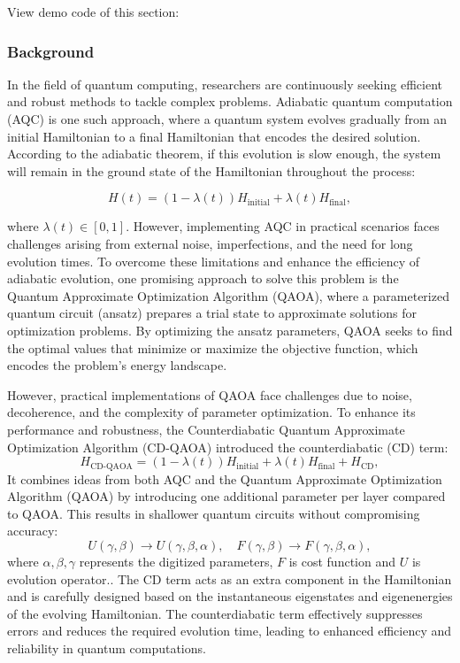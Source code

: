 

View demo code of this section: 

\subsubsection{Background}
In the field of quantum computing, researchers are continuously seeking efficient and robust methods to tackle complex problems. Adiabatic quantum computation (AQC) is one such approach, where a quantum system evolves gradually from an initial Hamiltonian to a final Hamiltonian that encodes the desired solution. According to the adiabatic theorem, if this evolution is slow enough, the system will remain in the ground state of the Hamiltonian throughout the process:

\begin{equation}
    H(t) = (1-\lambda(t))H_{\text{initial}} + \lambda(t)H_{\text{final}},
\end{equation}

where $\lambda(t)\in[0,1]$. However, implementing AQC in practical scenarios faces challenges arising from external noise, imperfections, and the need for long evolution times. To overcome these limitations and enhance the efficiency of adiabatic evolution, one promising approach to solve this problem is the Quantum Approximate Optimization Algorithm (QAOA), where a parameterized quantum circuit (ansatz) prepares a trial state to approximate solutions for optimization problems. By optimizing the ansatz parameters, QAOA seeks to find the optimal values that minimize or maximize the objective function, which encodes the problem's energy landscape.

However, practical implementations of QAOA face challenges due to noise, decoherence, and the complexity of parameter optimization. To enhance its performance and robustness, the Counterdiabatic Quantum Approximate Optimization Algorithm (CD-QAOA) introduced the counterdiabatic (CD) term:
\begin{equation}
    H_{\text{CD-QAOA}} = (1 - \lambda(t))H_{\text{initial}} + \lambda(t)H_{\text{final}} + H_{\text{CD}},
\end{equation}
It combines ideas from both AQC and the Quantum Approximate Optimization Algorithm (QAOA) by introducing one additional parameter per layer compared to QAOA. This results in shallower quantum circuits without compromising accuracy:
\begin{equation}
    U(\gamma, \beta)\to U(\gamma, \beta, \alpha), \quad F(\gamma, \beta)\to F(\gamma, \beta, \alpha),
\end{equation}
where $\alpha, \beta, \gamma$ represents the digitized parameters, $F$ is cost function and $U$ is evolution operator..
The CD term acts as an extra component in the Hamiltonian and is carefully designed based on the instantaneous eigenstates and eigenenergies of the evolving Hamiltonian.  The counterdiabatic term effectively suppresses errors and reduces the required evolution time, leading to enhanced efficiency and reliability in quantum computations.

